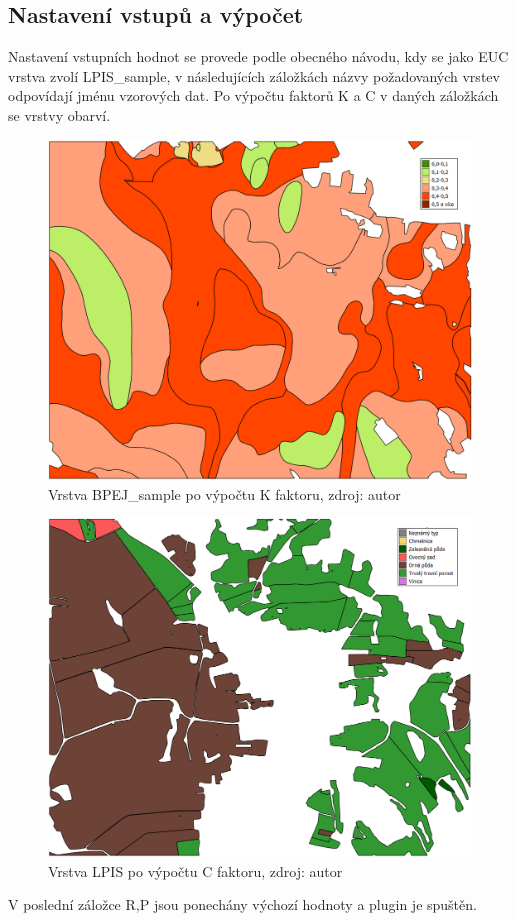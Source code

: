 \subsection{Nastavení vstupů a výpočet} Nastavení vstupních hodnot se
provede podle obecného návodu, kdy se jako EUC vrstva zvolí
LPIS\_sample, v následujících záložkách názvy požadovaných vrstev
odpovídají jménu vzorových dat. Po výpočtu faktorů K a C v daných
záložkách se vrstvy obarví.
\begin{figure}[H] \centering
		\includegraphics[width=.5\textwidth]{./pictures/bpej_layer2.png}
		\caption[Vrstva BPEJ\_sample po výpočtu K
faktoru]{Vrstva BPEJ\_sample po výpočtu K faktoru, zdroj: autor}
		\label{bpej_sample2}
\end{figure}
\begin{figure}[H] \centering
		\includegraphics[width=.5\textwidth]{./pictures/lpis_layer2.png}
		\caption[Vrstva LPIS po výpočtu C faktoru]{Vrstva LPIS
po výpočtu C faktoru, zdroj: autor}
		\label{lpis_sample2}
\end{figure} V poslední záložce R,P jsou ponechány výchozí hodnoty a
plugin je spuštěn.
\newpage
